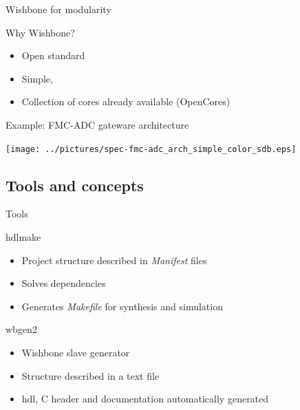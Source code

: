 \documentclass[compress,red]{beamer}
\begin{document}
\begin{frame}{Wishbone for modularity}

  \begin{block}{Why Wishbone?}
    \begin{itemize}
    \item Open standard
    \item Simple, %
    \item Collection of cores already available (OpenCores)
    \end{itemize}
  \end{block}


\end{frame}

\begin{frame}{Example: FMC-ADC gateware architecture}

  \begin{center}
    \texttt{[image: ../pictures/spec-fmc-adc\_arch\_simple\_color\_sdb.eps]}
  \end{center}

\end{frame}

\subsection{Tools and concepts}

\begin{frame}{Tools} %

  \begin{block}{hdlmake}
    \begin{itemize}
    \item Project structure described in \textit{Manifest} files
    \item Solves dependencies
    \item Generates \textit{Makefile} for synthesis and simulation
    \end{itemize}
  \end{block}

  \begin{block}{wbgen2}
    \begin{itemize}
    \item Wishbone slave generator
    \item Structure described in a text file
    \item hdl, C header and documentation automatically generated
    \end{itemize}
  \end{block}

\end{frame}
\end{document}
